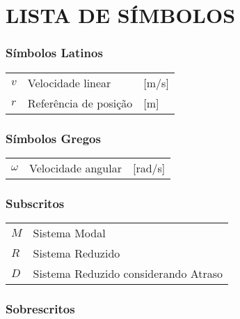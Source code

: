 




\chapter*{LISTA DE SÍMBOLOS}



\subsection*{Símbolos Latinos}

\begin{tabular}{p{}p{}>{\PreserveBacklash\raggedleft}p{}}
$v$  & Velocidade linear  & {[}m/s{]}\tabularnewline
$r$ & Referência de posição & {[}m{]}\tabularnewline
\end{tabular}

\subsection*{Símbolos Gregos}

\begin{tabular}{p{}p{}>{\PreserveBacklash\raggedleft}p{}}
$\omega$ & Velocidade angular & {[}rad/s{]}\tabularnewline
\end{tabular}


\subsection*{Subscritos}

\begin{tabular}{p{}p{}}
$M$ & Sistema Modal\tabularnewline
$R$ & Sistema Reduzido\tabularnewline
$D$ & Sistema Reduzido considerando Atraso\tabularnewline
\end{tabular}


\subsection*{Sobrescritos}

